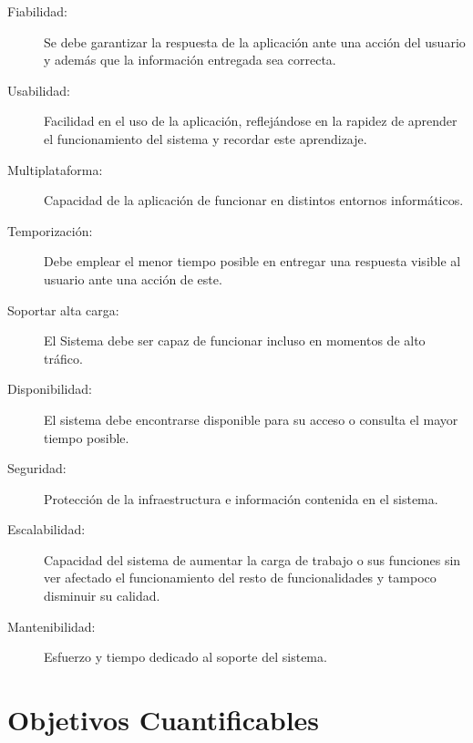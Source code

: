 \begin{description}

\item[Fiabilidad:]\hfill

Se debe garantizar la respuesta de la aplicación ante una acción del usuario y además que la información entregada sea correcta.

\item[Usabilidad:]\hfill

Facilidad en el uso de la aplicación, reflejándose en la rapidez de aprender el funcionamiento del sistema y recordar este aprendizaje.

\item[Multiplataforma:]\hfill

Capacidad de la aplicación de funcionar en distintos entornos informáticos.

\item[Temporización:]\hfill 

Debe emplear el menor tiempo posible en entregar una respuesta visible al usuario ante una acción de este.

\item[Soportar alta carga:]\hfill 

El Sistema debe ser capaz de funcionar incluso en momentos de alto tráfico. 

\item[Disponibilidad:]\hfill 

El sistema debe encontrarse disponible para su acceso o consulta el mayor tiempo posible.

\item[Seguridad:]\hfill 

Protección de la infraestructura e información contenida en el sistema.

\item[Escalabilidad:]\hfill 

Capacidad del sistema de aumentar la carga de trabajo o sus funciones sin ver afectado el funcionamiento del resto de funcionalidades y tampoco disminuir su calidad.

\item[Mantenibilidad:]\hfill

 Esfuerzo y tiempo dedicado al soporte del sistema.

\end{description}

\section{Objetivos Cuantificables}

